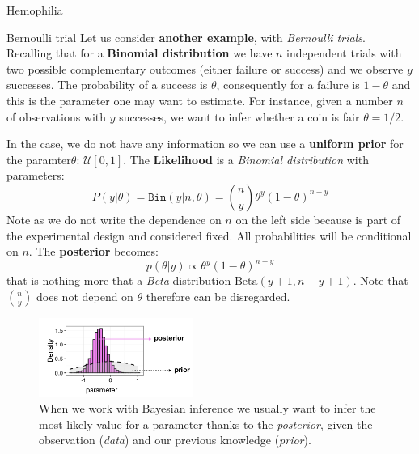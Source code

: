 \documentclass[../main/main.tex]{subfiles}
\begin{document}
\begin{example}{Hemophilia}{}
\end{example}


\begin{example}{Bernoulli trial}{}
Let us consider \textbf{another example}, with \textit{Bernoulli trials}. Recalling that for a \textbf{Binomial distribution} we have $n$ independent trials with two possible complementary outcomes (either failure or success) and we observe $y$ successes. The probability of a success is $\theta$, consequently for a failure is $1-\theta$ and this is the parameter one may want to estimate. For instance, given a number $n$ of observations with $y$ successes, we want to infer whether a coin is fair $\theta = 1/2$.

In the case, we do not have any information so we can use a \textbf{uniform prior} for the paramter$\theta$: $\mathcal{U}[0,1]$. The \textbf{Likelihood} is a \textit{Binomial distribution} with parameters:
\begin{equation*}
P(y|\theta) = \texttt{Bin}(y|n,\theta ) = \binom{n}{y} \theta^y (1-\theta)^{n-y}
\end{equation*}
Note as we do not write the dependence on $n$ on the left side because is part of the experimental design and considered fixed. All probabilities will be conditional on $n$. The \textbf{posterior} becomes:
\begin{equation*}
    p(\theta|y) \propto \theta^y (1-\theta)^{n-y}
\end{equation*}
that is nothing more that a \textit{Beta} distribution $\text{Beta}(y+1, n-y+1)$. Note that $\binom{n}{y}$ does not depend on $\theta$ therefore can be disregarded.

\end{example}

\begin{figure}[h!]
\centering
\includegraphics[width=0.45\textwidth]{../lessons/image/19/image06.png}
\caption{\label{fig:19_06} When we work with Bayesian inference we usually want to infer the most likely value for a parameter thanks to the \textit{posterior}, given the observation (\textit{data}) and our previous knowledge (\textit{prior}). }
\end{figure}
\end{document}
